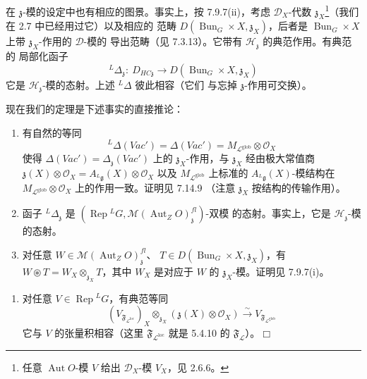 在 $\mathfrak{z}$-模的设定中也有相应的图景。事实上，按 7.9.7(ii)，考虑
$\mathcal{D}_X$-代数 $\mathfrak{z}_X$\footnote{任意 $\operatorname{Aut}O$-模 $V$
给出 $\mathcal{D}_X$-模 $V_X$，见 2.6.6。}（我们在 2.7 中已经用过它）以及相应的
范畴 $D(\operatorname{Bun}_G\times X,\mathfrak{z}_X)$，后者是
$\operatorname{Bun}_G\times X$ 上带 $\mathfrak{z}_X$-作用的 $\mathcal{D}$-模的
导出范畴（见 7.3.13）。它带有 $\mathcal{H}_{\mathfrak{z}}$ 的典范作用。有典范的
局部化函子
\[
{}^{L}\Delta_{\mathfrak{z}}:\ D_{HC\mathfrak{z}}\to
D(\operatorname{Bun}_G\times X,\mathfrak{z}_X)
\]
它是 $\mathcal{H}_{\mathfrak{z}}$-模的态射。上述 ${}^{L}\Delta$ 彼此相容（它们
与忘掉 $\mathfrak{z}$-作用可交换）。

现在我们的定理是下述事实的直接推论：

\begin{enumerate}[label=(\alph*),leftmargin=2.6em]
\item 有自然的等同
\begin{equation}\tag{283}
{}^{L}\Delta(\mathit{Vac}')=\Delta(\mathit{Vac}')
=M_{\mathcal{L}^{\mathrm{glob}}}\otimes\mathcal{O}_X
\end{equation}
使得 $\Delta(\mathit{Vac}')=\Delta_{\mathfrak{z}}(\mathit{Vac}')$ 上的
$\mathfrak{z}_X$-作用，与 $\mathfrak{z}_X$ 经由极大常值商
$\mathfrak{z}(X)\otimes\mathcal{O}_X=A_{{}^{L}\mathfrak{g}}(X)\otimes\mathcal{O}_X$
以及 $M_{\mathcal{L}^{\mathrm{glob}}}$ 上标准的 $A_{{}^{L}\mathfrak{g}}(X)$-模结构在
$M_{\mathcal{L}^{\mathrm{glob}}}\otimes\mathcal{O}_X$ 上的作用一致。证明见 7.14.9
（注意 $\mathfrak{z}_X$ 按结构的传输作用）。
\item 函子 ${}^{L}\Delta_{\mathfrak{z}}$ 是
$(\operatorname{Rep}{}^{L}G,\mathcal{M}(\operatorname{Aut}_ZO)^{fl}_{\mathfrak{z}})$-双模
的态射。事实上，它是 $\mathcal{H}_{\mathfrak{z}}$-模的态射。
\item 对任意 $W\in\mathcal{M}(\operatorname{Aut}_ZO)^{fl}_{\mathfrak{z}}$、
$T\in D(\operatorname{Bun}_G\times X,\mathfrak{z}_X)$，有
$W\circledast T=W_X\otimes_{\mathfrak{z}_X}T$，其中 $W_X$ 是对应于 $W$ 的
$\mathfrak{z}_X$-模。证明见 7.9.7(i)。
\end{enumerate}


\begin{enumerate}[label=(\alph*),leftmargin=2.6em]
\item[(d)] 对任意 $V\in\operatorname{Rep}{}^{L}G$，有典范等同
\[
(V_{\mathfrak{F}_{\mathcal{L}^{\mathrm{loc}}}})_X\otimes_{\mathfrak{z}_X}
(\mathfrak{z}(X)\otimes\mathcal{O}_X)\xrightarrow{\sim}
V_{\mathfrak{F}_{\mathcal{L}^{\mathrm{glob}}}}
\]
它与 $V$ 的张量积相容（这里 $\mathfrak{F}_{\mathcal{L}^{\mathrm{loc}}}$ 就是 5.4.10 的
$\mathfrak{F}_{\mathcal{L}}$）。\hfill$\Box$
\end{enumerate}

